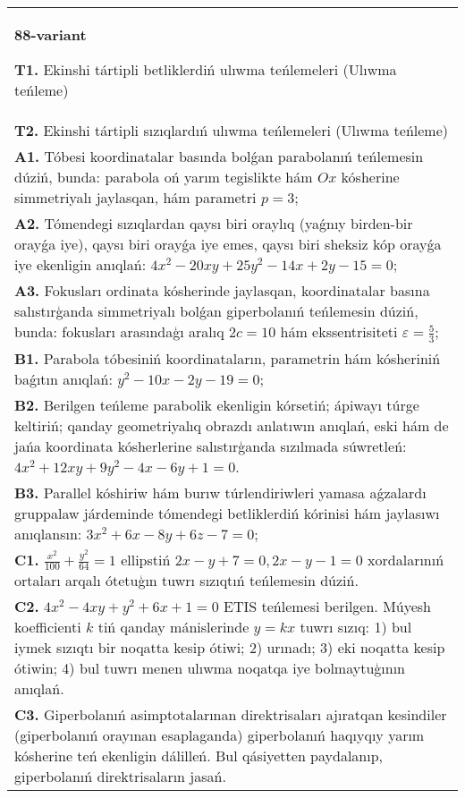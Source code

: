 \documentclass{article}
\begin{document}
\begin{tabular}{m{17cm}}
\textbf{88-variant}
\newline

\textbf{T1.} Ekinshi tártipli betliklerdiń ulıwma teńlemeleri (Ulıwma teńleme) \\
\textbf{T2.} Ekinshi tártipli sızıqlardıń ulıwma teńlemeleri (Ulıwma teńleme) \\
\textbf{A1.} Tóbesi koordinatalar basında bolǵan parabolanıń teńlemesin dúziń, bunda: parabola oń yarım tegislikte hám $Ox$ kósherine simmetriyalı jaylasqan, hám parametri $p=3$; \\
\textbf{A2.} Tómendegi sızıqlardan qaysı biri oraylıq (yaǵnıy birden-bir orayǵa iye), qaysı biri orayǵa iye emes, qaysı biri sheksiz kóp orayǵa iye ekenligin anıqlań: $4 x^2-20 x y+25 y^2-14 x+2 y-15=0$; \\
\textbf{A3.} Fokusları ordinata kósherinde jaylasqan, koordinatalar basına salıstırģanda simmetriyalı bolǵan giperbolanıń teńlemesin dúziń, bunda: fokusları arasındaģı aralıq $2 c=10$ hám ekssentrisiteti $\varepsilon=\frac{5}{3}$; \\
\textbf{B1.} Parabola tóbesiniń koordinataların, parametrin hám kósheriniń baǵıtın anıqlań: $y^2-10 x-2 y-19=0$; \\
\textbf{B2.} Berilgen teńleme parabolik ekenligin kórsetiń; ápiwayı túrge keltiriń; qanday geometriyalıq obrazdı anlatıwın anıqlań, eski hám de jańa koordinata kósherlerine salıstırģanda sızılmada súwretleń:$4 x^2+12 x y+9 y^2-4 x-6 y+1=0$. \\
\textbf{B3.} Parallel kóshiriw hám burıw túrlendiriwleri yamasa aǵzalardı gruppalaw járdeminde tómendegi betliklerdiń kórinisi hám jaylasıwı anıqlansın: $3 x^2+6 x-8 y+6 z-7=0$; \\
\textbf{C1.} $\frac{x^2}{100}+\frac{y^2}{64}=1$ ellipstiń $2 x-y+7=0,2 x-y-1=0$ xordalarınıń ortaları arqalı ótetuģın tuwrı sızıqtıń teńlemesin dúziń. \\
\textbf{C2.} $4 x^2-4 x y+y^2+6 x+1=0$ ETIS teńlemesi berilgen. Múyesh koefficienti $k$ tiń qanday mánislerinde $y=kx$ tuwrı sızıq: 1) bul iymek sızıqtı bir noqatta kesip ótiwi; 2) urınadı; 3) eki noqatta kesip ótiwin; 4) bul tuwrı menen ulıwma noqatqa iye bolmaytuģının anıqlań. \\
\textbf{C3.} Giperbolanıń asimptotalarınan direktrisaları ajıratqan kesindiler (giperbolanıń orayınan esaplaganda) giperbolanıń haqıyqıy yarım kósherine teń ekenligin dálilleń. Bul qásiyetten paydalanıp, giperbolanıń direktrisaların jasań. \\

\end{tabular}
\vspace{1cm}
\end{document}
